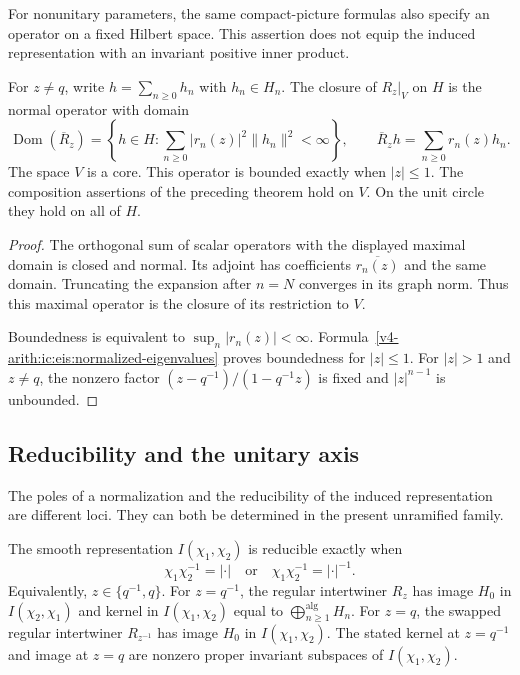 For nonunitary parameters, the same compact-picture formulas also specify
an operator on a fixed Hilbert space.
This assertion does not equip the induced representation with an invariant
positive inner product.

\begin{proposition}
\label{v4-arith:ic:eis:maximal-domain}
For $z\ne q$, write $h=\sum_{n\ge0}h_n$ with $h_n\in H_n$.
The closure of $R_z|_V$ on $H$ is the normal operator with domain
\[
 \operatorname{Dom}(\overline R_z)=
 \left\{h\in H:\sum_{n\ge0}|r_n(z)|^2\|h_n\|^2<\infty\right\},
 \qquad \overline R_zh=\sum_{n\ge0}r_n(z)h_n.
\]
The space $V$ is a core.
This operator is bounded exactly when $|z|\le1$.
The composition assertions of the preceding theorem hold on $V$.
On the unit circle they hold on all of $H$.
\end{proposition}

\begin{proof}
The orthogonal sum of scalar operators with the displayed maximal domain
is closed and normal.
Its adjoint has coefficients $\overline{r_n(z)}$ and the same domain.
Truncating the expansion after $n=N$ converges in its graph norm.
Thus this maximal operator is the closure of its restriction to $V$.

Boundedness is equivalent to $\sup_n|r_n(z)|<\infty$.
Formula~\eqref{v4-arith:ic:eis:normalized-eigenvalues} proves boundedness for
$|z|\le1$.
For $|z|>1$ and $z\ne q$, the nonzero factor
$(z-q^{-1})/(1-q^{-1}z)$ is fixed and $|z|^{n-1}$ is unbounded.
\end{proof}

\subsection{Reducibility and the unitary axis}

The poles of a normalization and the reducibility of the induced
representation are different loci.
They can both be determined in the present unramified family.

\begin{proposition}
\label{v4-arith:ic:eis:reducibility}
The smooth representation $I(\chi_1,\chi_2)$ is reducible exactly when
\[
 \chi_1\chi_2^{-1}=|\cdot|\quad\text{or}\quad
 \chi_1\chi_2^{-1}=|\cdot|^{-1}.
\]
Equivalently, $z\in\{q^{-1},q\}$.
For $z=q^{-1}$, the regular intertwiner $R_z$ has image $H_0$
in $I(\chi_2,\chi_1)$ and kernel in $I(\chi_1,\chi_2)$ equal to $\bigoplus_{n\ge1}^{\mathrm{alg}}H_n$.
For $z=q$, the swapped regular intertwiner $R_{z^{-1}}$ has image
$H_0$ in $I(\chi_1,\chi_2)$.
The stated kernel at $z=q^{-1}$ and image at $z=q$ are nonzero
proper invariant subspaces of $I(\chi_1,\chi_2)$.
\end{proposition}

